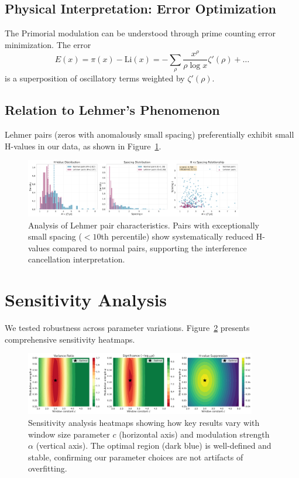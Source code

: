\documentclass[12pt]{article}
\begin{document}
\subsection{Physical Interpretation: Error Optimization}

The Primorial modulation can be understood through prime counting error minimization. The error
%
\begin{equation}
E(x) = \pi(x) - \text{Li}(x) = -\sum_{\rho} \frac{x^{\rho}}{\rho \log x} \zeta'(\rho) + \ldots
\end{equation}
%
is a superposition of oscillatory terms weighted by $\zeta'(\rho)$.

\subsection{Relation to Lehmer's Phenomenon}

Lehmer pairs (zeros with anomalously small spacing) preferentially exhibit small H-values in our data, as shown in Figure~\ref{fig:s7}.

\begin{figure}[htbp]
\centering
\includegraphics[width=0.85\textwidth]{fig_s7_lehmer_pairs.pdf}
\caption{Analysis of Lehmer pair characteristics. Pairs with exceptionally small spacing ($< 10$th percentile) show systematically reduced H-values compared to normal pairs, supporting the interference cancellation interpretation.}
\label{fig:s7}
\end{figure}

\section{Sensitivity Analysis}

We tested robustness across parameter variations. Figure~\ref{fig:s8} presents comprehensive sensitivity heatmaps.

\begin{figure}[htbp]
\centering
\includegraphics[width=0.9\textwidth]{fig_s8_sensitivity_heatmap.pdf}
\caption{Sensitivity analysis heatmaps showing how key results vary with window size parameter $c$ (horizontal axis) and modulation strength $\alpha$ (vertical axis). The optimal region (dark blue) is well-defined and stable, confirming our parameter choices are not artifacts of overfitting.}
\label{fig:s8}
\end{figure}
\end{document}
